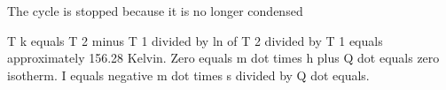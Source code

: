 The cycle is stopped because it is no longer condensed

T k equals T 2 minus T 1 divided by ln of T 2 divided by T 1 equals approximately 156.28 Kelvin. Zero equals m dot times h plus Q dot equals zero isotherm. I equals negative m dot times s divided by Q dot equals.